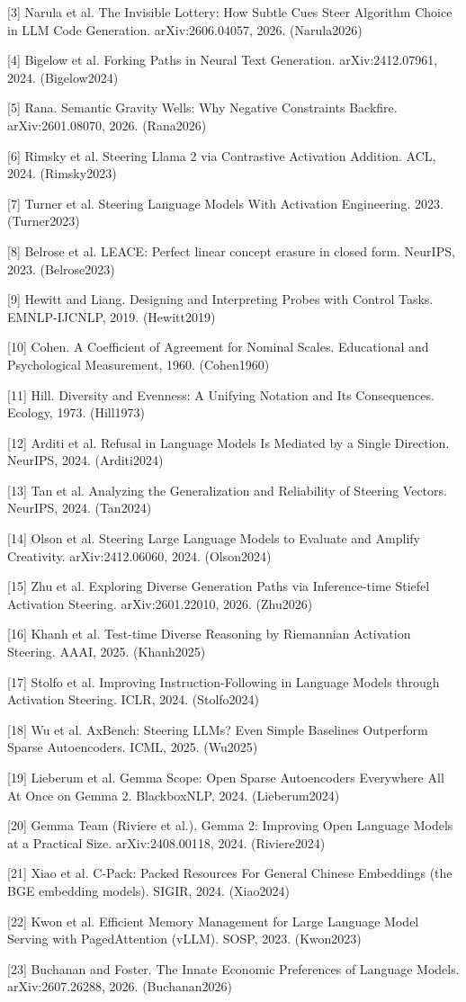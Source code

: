 \documentclass[11pt,letterpaper]{article}
\begin{document}
[3] Narula et al. The Invisible Lottery: How Subtle Cues Steer Algorithm Choice in LLM Code Generation. arXiv:2606.04057, 2026. (Narula2026)

[4] Bigelow et al. Forking Paths in Neural Text Generation. arXiv:2412.07961, 2024. (Bigelow2024)

[5] Rana. Semantic Gravity Wells: Why Negative Constraints Backfire. arXiv:2601.08070, 2026. (Rana2026)

[6] Rimsky et al. Steering Llama 2 via Contrastive Activation Addition. ACL, 2024. (Rimsky2023)

[7] Turner et al. Steering Language Models With Activation Engineering. 2023. (Turner2023)

[8] Belrose et al. LEACE: Perfect linear concept erasure in closed form. NeurIPS, 2023. (Belrose2023)

[9] Hewitt and Liang. Designing and Interpreting Probes with Control Tasks. EMNLP-IJCNLP, 2019. (Hewitt2019)

[10] Cohen. A Coefficient of Agreement for Nominal Scales. Educational and Psychological Measurement, 1960. (Cohen1960)

[11] Hill. Diversity and Evenness: A Unifying Notation and Its Consequences. Ecology, 1973. (Hill1973)

[12] Arditi et al. Refusal in Language Models Is Mediated by a Single Direction. NeurIPS, 2024. (Arditi2024)

[13] Tan et al. Analyzing the Generalization and Reliability of Steering Vectors. NeurIPS, 2024. (Tan2024)

[14] Olson et al. Steering Large Language Models to Evaluate and Amplify Creativity. arXiv:2412.06060, 2024. (Olson2024)

[15] Zhu et al. Exploring Diverse Generation Paths via Inference-time Stiefel Activation Steering. arXiv:2601.22010, 2026. (Zhu2026)

[16] Khanh et al. Test-time Diverse Reasoning by Riemannian Activation Steering. AAAI, 2025. (Khanh2025)

[17] Stolfo et al. Improving Instruction-Following in Language Models through Activation Steering. ICLR, 2024. (Stolfo2024)

[18] Wu et al. AxBench: Steering LLMs? Even Simple Baselines Outperform Sparse Autoencoders. ICML, 2025. (Wu2025)

[19] Lieberum et al. Gemma Scope: Open Sparse Autoencoders Everywhere All At Once on Gemma 2. BlackboxNLP, 2024. (Lieberum2024)

[20] Gemma Team (Riviere et al.). Gemma 2: Improving Open Language Models at a Practical Size. arXiv:2408.00118, 2024. (Riviere2024)

[21] Xiao et al. C-Pack: Packed Resources For General Chinese Embeddings (the BGE embedding models). SIGIR, 2024. (Xiao2024)

[22] Kwon et al. Efficient Memory Management for Large Language Model Serving with PagedAttention (vLLM). SOSP, 2023. (Kwon2023)

[23] Buchanan and Foster. The Innate Economic Preferences of Language Models. arXiv:2607.26288, 2026. (Buchanan2026)
\end{document}
